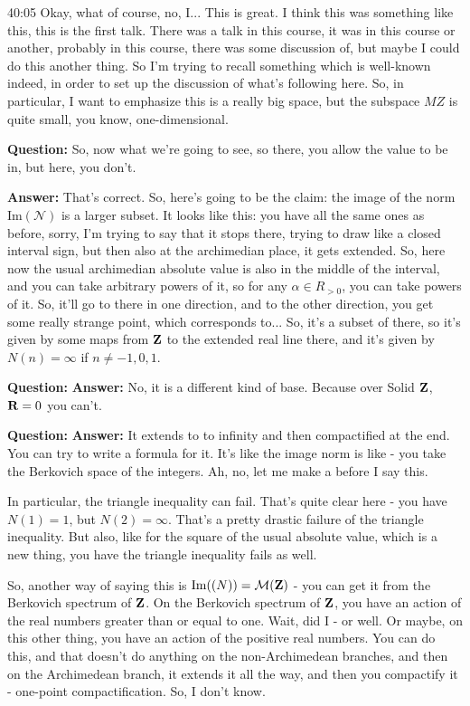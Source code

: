 \begin{example}
\begin{unfinished}{40:05}
Okay, what of course, no, I... This is great. I think this was something like this, this is the first talk. There was a talk in this course, it was in this course or another, probably in this course, there was some discussion of, but maybe I could do this another thing. 
So I'm trying to recall something which is well-known indeed, in order to set up the discussion of what's following here. So, in particular, I want to emphasize this is a really big space, but the subspace $MZ$  is quite small, you know, one-dimensional.

\textbf{Question:} So, now what we're going to see, so there, you allow the value to be in, but here, you don't. 

\textbf{Answer:} That's correct. So, here's going to be the claim: the image of the norm $\text{Im}(\mathcal{N})$ is a larger subset. It looks like this: you have all the same ones as before, sorry, I'm trying to say that it stops there, trying to draw like a closed interval sign, but then also at the archimedian place, it gets extended. So, here now the usual archimedian absolute value is also in the middle of the interval, and you can take arbitrary powers of it, so for any $\alpha \in R_{>0}$, you can take powers of it. So, it'll go to there in one direction, and to the other direction, you get some really strange point, which corresponds to... 
So, it's a subset of there, so it's given by some maps from $\mathbf Z$ to the extended real line there, and it's given by $N(n) = \infty$ if $n \neq -1, 0, 1$.

\textbf{Question:} 
\textbf{Answer:} No, it is a different kind of base. Because over Solid $\mathbf Z$, $\mathbf R = 0$ you can't.

\textbf{Question:} 
\textbf{Answer:} It extends to to infinity and then compactified at the end. You can try to write a formula for it. It's like the image norm is like - you take the Berkovich space of the integers. Ah, no, let me make a before I say this.

In particular, the triangle inequality can fail. That's quite clear here - you have $N(1) = 1$, but $N(2) = \infty$. That's a pretty drastic failure of the triangle inequality. But also, like for the square of the usual absolute value, which is a new thing, you have the triangle inequality fails as well.

So, another way of saying this is $\text{Im}(\mathcal(N)) = \mathcal{M}(\mathbf Z)$ - you can get it from the Berkovich spectrum of $\mathbf Z$. On the Berkovich spectrum of $\mathbf Z$, you have an action of the real numbers greater than or equal to one. Wait, did I - or well. Or maybe, on this other thing, you have an action of the positive real numbers. You can do this, and that doesn't do anything on the non-Archimedean branches, and then on the Archimedean branch, it extends it all the way, and then you compactify it - one-point compactification. So, I don't know.


\end{unfinished}
\end{example}

